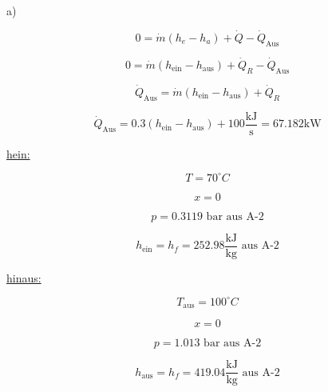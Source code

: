 a)


\[
0 = \dot{m} (h_e - h_a) + \dot{Q} - \dot{Q}_{\text{Aus}}
\]

\[
0 = \dot{m} (h_{\text{ein}} - h_{\text{aus}}) + \dot{Q}_R - \dot{Q}_{\text{Aus}}
\]

\[
\dot{Q}_{\text{Aus}} = \dot{m} (h_{\text{ein}} - h_{\text{aus}}) + \dot{Q}_R
\]

\[
\dot{Q}_{\text{Aus}} = 0.3 (h_{\text{ein}} - h_{\text{aus}}) + 100 \frac{\text{kJ}}{\text{s}} = 67.182 \text{kW}
\]

\underline{hein:}

\[
T = 70^\circ C
\]

\[
x = 0
\]

\[
p = 0.3119 \text{ bar aus A-2}
\]

\[
h_{\text{ein}} = h_f = 252.98 \frac{\text{kJ}}{\text{kg}} \text{ aus A-2}
\]

\underline{hinaus:}

\[
T_{\text{aus}} = 100^\circ C
\]

\[
x = 0
\]

\[
p = 1.013 \text{ bar aus A-2}
\]

\[
h_{\text{aus}} = h_f = 419.04 \frac{\text{kJ}}{\text{kg}} \text{ aus A-2}
\]